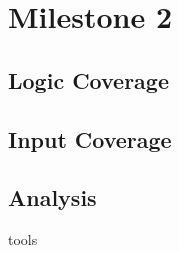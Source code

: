 \section{Milestone 2}

\subsection{Logic Coverage}

\subsection{Input Coverage}

\subsection{Analysis}

{tools}

